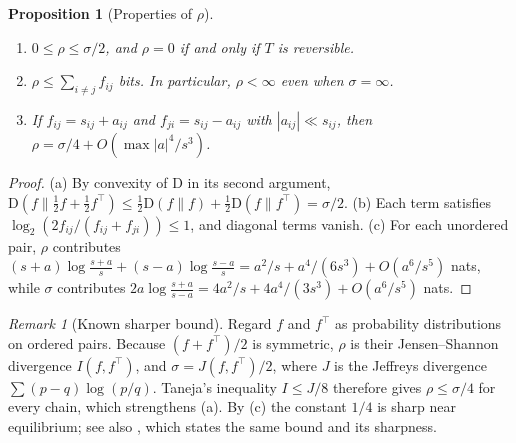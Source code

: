 \documentclass[11pt]{article}
\newtheorem{proposition}[theorem]{Proposition}
\theoremstyle{definition}
\theoremstyle{remark}
\newtheorem{remark}[theorem]{Remark}
\newcommand{\KL}{\mathrm{D}}
\begin{document}
\begin{proposition}[Properties of $\rho$]\label{prop:rho}
\begin{enumerate}[label=(\alph*),itemsep=0.1em]
\item $0\le\rho\le\sigma/2$, and $\rho=0$ if and only if $T$ is reversible.
\item $\rho\le\sum_{i\ne j}f_{ij}$ bits. In particular, $\rho<\infty$ even when $\sigma=\infty$.
\item If $f_{ij}=s_{ij}+a_{ij}$ and $f_{ji}=s_{ij}-a_{ij}$ with $|a_{ij}|\ll s_{ij}$, then $\rho=\sigma/4+O(\max|a|^4/s^3)$.
\end{enumerate}
\end{proposition}
\begin{proof}
(a) By convexity of $\KL$ in its second argument, $\KL(f\|\tfrac12f+\tfrac12f^\top)\le\tfrac12\KL(f\|f)+\tfrac12\KL(f\|f^\top)=\sigma/2$. (b) Each term satisfies $\log_2(2f_{ij}/(f_{ij}+f_{ji}))\le1$, and diagonal terms vanish. (c) For each unordered pair, $\rho$ contributes $(s+a)\log\frac{s+a}{s}+(s-a)\log\frac{s-a}{s}=a^2/s+a^4/(6s^3)+O(a^6/s^5)$ nats, while $\sigma$ contributes $2a\log\frac{s+a}{s-a}=4a^2/s+4a^4/(3s^3)+O(a^6/s^5)$ nats.
\end{proof}

\begin{remark}[Known sharper bound]\label{rem:taneja}
Regard $f$ and $f^\top$ as probability distributions on ordered pairs. Because $(f+f^\top)/2$ is symmetric, $\rho$ is their Jensen--Shannon divergence $I(f,f^\top)$, and $\sigma=J(f,f^\top)/2$, where $J$ is the Jeffreys divergence $\sum(p-q)\log(p/q)$. Taneja's inequality $I\le J/8$ \cite[Thm.~3.1]{taneja2005} therefore gives $\rho\le\sigma/4$ for every chain, which strengthens (a). By (c) the constant $1/4$ is sharp near equilibrium; see also \cite{crooks2008}, which states the same bound and its sharpness.
\end{remark}
\end{document}
